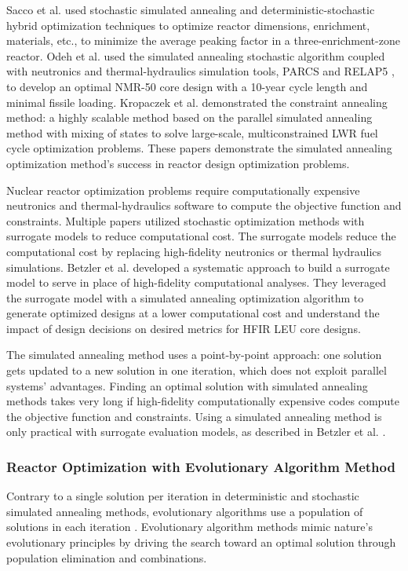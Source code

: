 Sacco et al. \cite{sacco_two_2006,sacco_metropolis_2008} used stochastic 
simulated annealing and deterministic-stochastic hybrid optimization techniques 
to optimize reactor dimensions, enrichment, materials, etc., to 
minimize the average peaking factor in a three-enrichment-zone reactor. 
Odeh et al. \cite{odeh_core_2016} used the simulated annealing stochastic algorithm 
coupled with neutronics and thermal-hydraulics simulation tools, \gls{PARCS} and RELAP5
\cite{fletcher_relap5mod3_1992}, to develop an optimal \gls{NMR-50} core design 
with a 10-year cycle length and minimal fissile loading. 
Kropaczek et al. \cite{kropaczek_large-scale_2019} demonstrated the constraint 
annealing method: a highly scalable method based on the parallel simulated annealing 
method with mixing of states \cite{kropaczek_constraint_2019} to solve large-scale, 
multiconstrained \gls{LWR} fuel cycle optimization problems. 
These papers demonstrate the simulated annealing optimization method's success in 
reactor design optimization problems. 

Nuclear reactor optimization problems require computationally 
expensive neutronics and thermal-hydraulics software to compute the objective 
function and constraints. 
Multiple papers utilized stochastic optimization methods with surrogate models 
to reduce computational cost. 
The surrogate models reduce the computational cost by replacing high-fidelity
neutronics or thermal hydraulics simulations.
Betzler et al. \cite{betzler_design_2019} developed a systematic approach to 
build a surrogate model to serve in place of high-fidelity computational 
analyses. 
They leveraged the surrogate model with a simulated annealing optimization 
algorithm to generate optimized designs at a lower computational cost and
understand the impact of design decisions on desired metrics for \gls{HFIR} \gls{LEU} 
core designs.

The simulated annealing method uses a point-by-point approach:
one solution gets updated to a new solution in one iteration, which does not 
exploit parallel systems' advantages.
Finding an optimal solution with simulated annealing methods takes very long if 
high-fidelity computationally expensive codes compute the objective function and 
constraints.
Using a simulated annealing method is only practical with surrogate evaluation models, 
as described in Betzler et al. \cite{betzler_design_2019}.

\subsubsection{Reactor Optimization with Evolutionary Algorithm Method}
Contrary to a single solution per iteration in deterministic and stochastic 
simulated annealing methods, evolutionary algorithms use a population of 
solutions in each iteration \cite{deb_multi-objective_2001}. 
Evolutionary algorithm methods mimic nature's evolutionary principles by driving 
the search toward an optimal solution through population elimination and combinations. 

